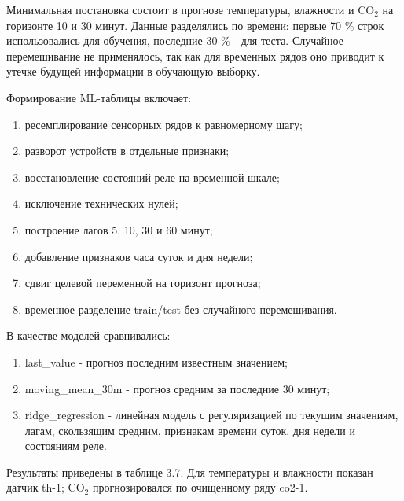 \documentclass[a4paper,14pt]{extarticle}
\renewcommand{\texttt}[1]{\textnormal{#1}}
\providecommand{\tightlist}{%
  \setlength{\itemsep}{0pt}\setlength{\parskip}{0pt}}
\begin{document}
Минимальная постановка состоит в прогнозе температуры, влажности и
CO\(_2\) на горизонте 10 и 30 минут. Данные разделялись по времени:
первые 70 \% строк использовались для обучения, последние 30 \% - для
теста. Случайное перемешивание не применялось, так как для временных
рядов оно приводит к утечке будущей информации в обучающую выборку.

Формирование ML-таблицы включает:

\begin{enumerate}
\def\labelenumi{\arabic{enumi})}
\tightlist
\item
  ресемплирование сенсорных рядов к равномерному шагу;
\item
  разворот устройств в отдельные признаки;
\item
  восстановление состояний реле на временной шкале;
\item
  исключение технических нулей;
\item
  построение лагов 5, 10, 30 и 60 минут;
\item
  добавление признаков часа суток и дня недели;
\item
  сдвиг целевой переменной на горизонт прогноза;
\item
  временное разделение train/test без случайного перемешивания.
\end{enumerate}

В качестве моделей сравнивались:

\begin{enumerate}
\def\labelenumi{\arabic{enumi})}
\tightlist
\item
  \texttt{last\_value} - прогноз последним известным значением;
\item
  \texttt{moving\_mean\_30m} - прогноз средним за последние 30 минут;
\item
  \texttt{ridge\_regression} - линейная модель с регуляризацией по
  текущим значениям, лагам, скользящим средним, признакам времени суток,
  дня недели и состояниям реле.
\end{enumerate}

Результаты приведены в таблице 3.7. Для температуры и влажности показан
датчик \texttt{th-1}; CO\(_2\) прогнозировался по очищенному ряду
\texttt{co2-1}.
\end{document}
